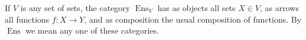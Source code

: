 If $V$ is any set of sets, the category $\operatorname{Ens}_V$ has as objects all sets $X \in V$, as arrows all functions $f : X \to Y$, and as composition the usual composition of functions. By $\operatorname{Ens}$ we mean any one of these categories.
